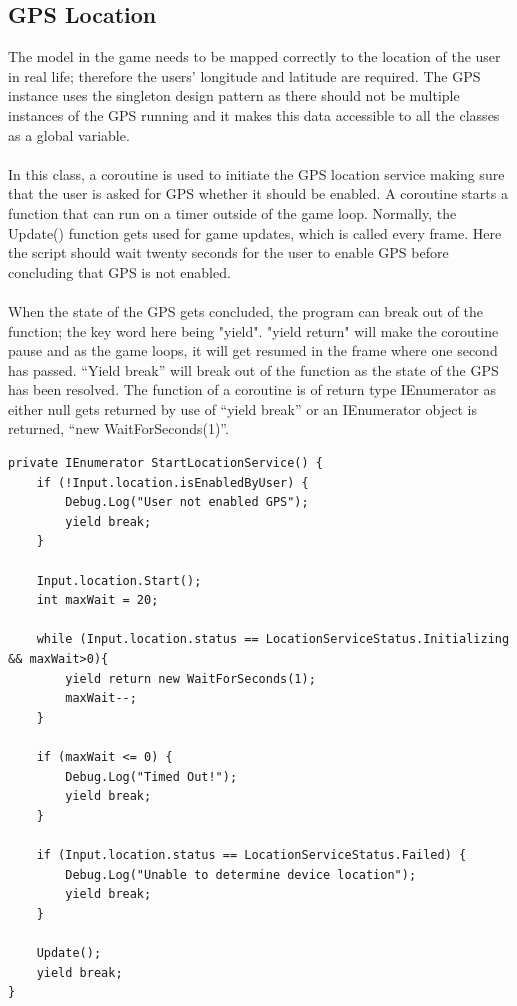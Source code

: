 \documentclass[a4paper]{report}
\begin{document}
\subsection{GPS Location}
The model in the game needs to be mapped correctly to the location of the user in real life; therefore the users' longitude and latitude are required. The GPS instance uses the singleton design pattern as there should not be multiple instances of the GPS running and it makes this data accessible to all the classes as a global variable.
\\\\
In this class, a coroutine is used to initiate the GPS location service making sure that the user is asked for GPS whether it should be enabled. A coroutine starts a function that can run on a timer outside of the game loop. Normally, the Update() function gets used for game updates, which is called every frame. Here the script should wait twenty seconds for the user to enable GPS before concluding that GPS is not enabled. 
\\\\
When the state of the GPS gets concluded, the program can break out of the function; the key word here being "yield". "yield return" will make the coroutine pause and as the game loops, it will get resumed in the frame where one second has passed. “Yield break” will break out of the function as the state of the GPS has been resolved. The function of a coroutine is of return type IEnumerator as either null gets returned by use of “yield break” or an IEnumerator object is returned, “new WaitForSeconds(1)”. \cite{Unity} \cite{GPS}
\begin{Verbatim}[tabsize=4]
private IEnumerator StartLocationService() {
	if (!Input.location.isEnabledByUser) {
		Debug.Log("User not enabled GPS");
		yield break;
	}
	
	Input.location.Start();
	int maxWait = 20;
	
	while (Input.location.status == LocationServiceStatus.Initializing && maxWait>0){
		yield return new WaitForSeconds(1);
		maxWait--;
	}
	
	if (maxWait <= 0) {
		Debug.Log("Timed Out!");
		yield break;
	}
	
	if (Input.location.status == LocationServiceStatus.Failed) {
		Debug.Log("Unable to determine device location");
		yield break;
	}
	
	Update();
	yield break;
}
\end{Verbatim}
\end{document}
